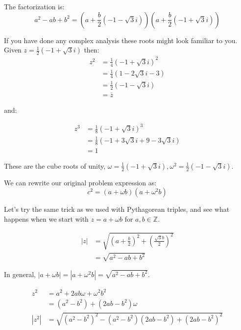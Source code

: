 \documentclass{article}
\begin{document}
The factorization is:
\[ a^2 - ab + b^2 = 
\left(a + \frac{b}{2}\left(-1 - \sqrt{3}i\right) \right)
\left(a + \frac{b}{2}\left(-1 + \sqrt{3}i\right) \right) \]

If you have done any complex analysis these roots might look familiar to you. Given 
$z = \frac{1}{2}(-1+\sqrt{3}i)$ then:
\begin{equation*}
        \begin{split} 
		z^2 & = \frac{1}{4}(-1+\sqrt{3}i)^2 \\
		& = \frac{1}{4}(1 - 2\sqrt{3}i - 3) \\
		& = \frac{1}{2}(-1 - \sqrt{3}i) \\
		& = \bar{z}
        \end{split}
\end{equation*}

and:

\begin{equation*}
        \begin{split}
                z^3 & = \frac{1}{8}(-1+\sqrt{3}i)^3 \\
		& = \frac{1}{8}(- 1 + 3\sqrt{3}i +9 -3\sqrt{3}i) \\
                & = 1
        \end{split}
\end{equation*}

These are the cube roots of unity, $\omega = \frac{1}{2}(-1+\sqrt{3}i), \omega^2 = \frac{1}{2}(-1-\sqrt{3}i)$.

We can rewrite our original problem expression as:
\[ c^2 = (a+\omega b)(a + \omega^2 b) \]

Let's try the same trick as we used with Pythagorean triples, and see what happens when we start with
$z = a + \omega b$ for $a,b\in \mathbb{Z}$.

\begin{equation*}
        \begin{split}
		|z| & = \sqrt{(a+\frac{b}{2})^2 + (\frac{\sqrt{3}b}{2})^2} \\ 
		    &= \sqrt{a^2-ab+b^2} 
	\end{split}
\end{equation*}

In general, $|a+ \omega b| = |a + \omega^2 b| = \sqrt{a^2-ab+b^2}$.

\begin{equation*}
        \begin{split}
                z^2 & = a^2 + 2ab\omega +\omega^2 b^2 \\
		    & = (a^2 -b^2) + (2ab - b^2)\omega \\
		|z^2| &= \sqrt{(a^2-b^2)^2 - (a^2-b^2)(2ab-b^2) + (2ab-b^2)^2}
	\end{split}
\end{equation*}
\end{document}
